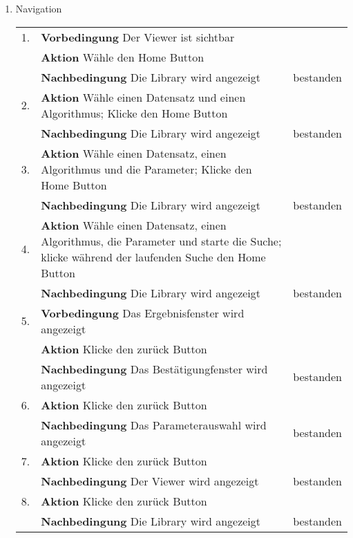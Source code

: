\begin{enumerate} [label=\bfseries /TS \arabic*0/, leftmargin=*]
	\item Navigation \newline \newline
	\begin{tabular}{@{}rp{4in}|l}
	1. & \textbf{Vorbedingung} Der Viewer ist sichtbar & \\
	   & \textbf{Aktion} Wähle den Home Button & \\
	   & \textbf{Nachbedingung} Die Library wird angezeigt & bestanden \\
	\hline
	2. & \textbf{Aktion} Wähle einen Datensatz und einen Algorithmus; Klicke den Home Button & \\
	   & \textbf{Nachbedingung} Die Library wird angezeigt & bestanden \\
	\hline
	3. & \textbf{Aktion} Wähle einen Datensatz, einen Algorithmus und die Parameter; Klicke den Home Button & \\
	   & \textbf{Nachbedingung} Die Library wird angezeigt & bestanden \\
	\hline
	4. & \textbf{Aktion} Wähle einen Datensatz, einen Algorithmus, die Parameter und starte die Suche; klicke während der laufenden Suche den Home Button & \\
	   & \textbf{Nachbedingung} Die Library wird angezeigt & bestanden \\
	\hline
	5. & \textbf{Vorbedingung} Das Ergebnisfenster wird angezeigt & \\
	   & \textbf{Aktion} Klicke den zurück Button & \\
	   & \textbf{Nachbedingung} Das Bestätigungfenster wird angezeigt & bestanden \\
	\hline
	6. & \textbf{Aktion} Klicke den zurück Button & \\
	   & \textbf{Nachbedingung} Das Parameterauswahl wird angezeigt & bestanden \\
	\hline
	7. & \textbf{Aktion} Klicke den zurück Button & \\
	   & \textbf{Nachbedingung} Der Viewer wird angezeigt & bestanden \\
	\hline
	8. & \textbf{Aktion} Klicke den zurück Button & \\
	   & \textbf{Nachbedingung} Die Library wird angezeigt & bestanden \\
	\end{tabular}

\end{enumerate}

\newpage

